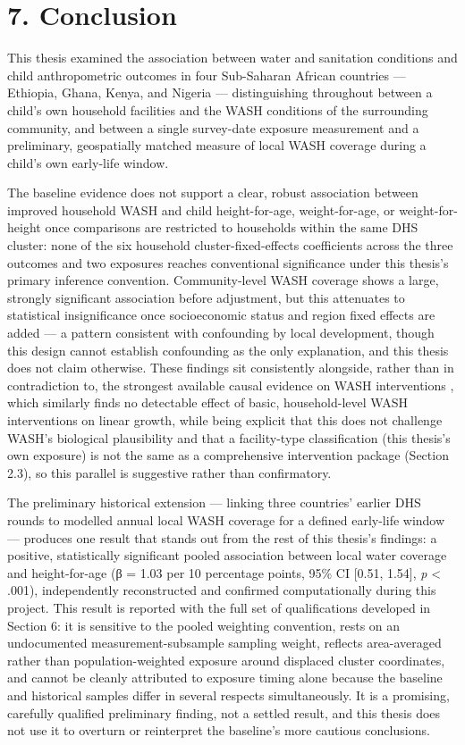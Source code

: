 \section*{7. Conclusion}

This thesis examined the association between water and sanitation conditions and child anthropometric outcomes in four Sub-Saharan African countries --- Ethiopia, Ghana, Kenya, and Nigeria --- distinguishing throughout between a child's own household facilities and the WASH conditions of the surrounding community, and between a single survey-date exposure measurement and a preliminary, geospatially matched measure of local WASH coverage during a child's own early-life window.

The baseline evidence does not support a clear, robust association between improved household WASH and child height-for-age, weight-for-age, or weight-for-height once comparisons are restricted to households within the same DHS cluster: none of the six household cluster-fixed-effects coefficients across the three outcomes and two exposures reaches conventional significance under this thesis's primary inference convention. Community-level WASH coverage shows a large, strongly significant association before adjustment, but this attenuates to statistical insignificance once socioeconomic status and region fixed effects are added --- a pattern consistent with confounding by local development, though this design cannot establish confounding as the only explanation, and this thesis does not claim otherwise. These findings sit consistently alongside, rather than in contradiction to, the strongest available causal evidence on WASH interventions \parencite{Cumming2019}, which similarly finds no detectable effect of basic, household-level WASH interventions on linear growth, while being explicit that this does not challenge WASH's biological plausibility and that a facility-type classification (this thesis's own exposure) is not the same as a comprehensive intervention package (Section 2.3), so this parallel is suggestive rather than confirmatory.

The preliminary historical extension --- linking three countries' earlier DHS rounds to modelled annual local WASH coverage for a defined early-life window --- produces one result that stands out from the rest of this thesis's findings: a positive, statistically significant pooled association between local water coverage and height-for-age (β = 1.03 per 10 percentage points, 95\% CI [0.51, 1.54], \textit{p} < .001), independently reconstructed and confirmed computationally during this project. This result is reported with the full set of qualifications developed in Section 6: it is sensitive to the pooled weighting convention, rests on an undocumented measurement-subsample sampling weight, reflects area-averaged rather than population-weighted exposure around displaced cluster coordinates, and cannot be cleanly attributed to exposure timing alone because the baseline and historical samples differ in several respects simultaneously. It is a promising, carefully qualified preliminary finding, not a settled result, and this thesis does not use it to overturn or reinterpret the baseline's more cautious conclusions.

